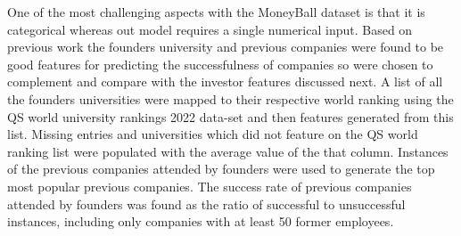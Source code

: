 \documentclass{article}
\begin{document}
One of the most challenging aspects with the MoneyBall dataset is that it is categorical whereas out model requires a single numerical input. Based on previous work the founders university and previous companies were found to be good features for predicting the successfulness of companies so were chosen to complement and compare with the investor features discussed next. A list of all the founders universities were mapped to their respective world ranking using the QS world university rankings 2022 data-set and then features generated from this list. Missing entries and universities which did not feature on the QS world ranking list were populated with the average value of the that column. Instances of the previous companies attended by founders were used to generate the top most popular previous companies. The success rate of previous companies attended by founders was  found as the ratio of successful to unsuccessful instances, including only companies with at least 50 former employees.
\end{document}

